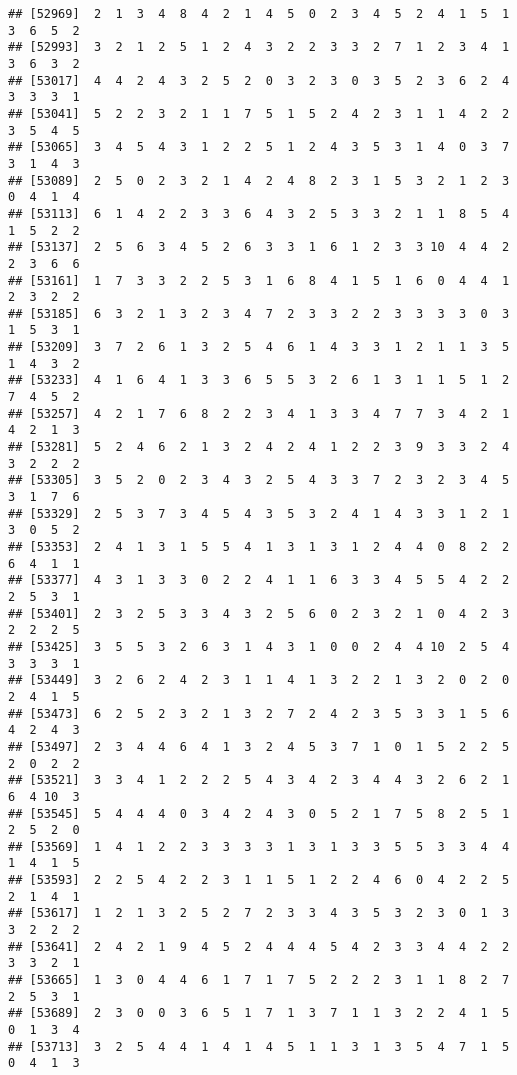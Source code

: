 \documentclass[
]{article}
\begin{document}
\begin{verbatim}
## [52969]  2  1  3  4  8  4  2  1  4  5  0  2  3  4  5  2  4  1  5  1  3  6  5  2
## [52993]  3  2  1  2  5  1  2  4  3  2  2  3  3  2  7  1  2  3  4  1  3  6  3  2
## [53017]  4  4  2  4  3  2  5  2  0  3  2  3  0  3  5  2  3  6  2  4  3  3  3  1
## [53041]  5  2  2  3  2  1  1  7  5  1  5  2  4  2  3  1  1  4  2  2  3  5  4  5
## [53065]  3  4  5  4  3  1  2  2  5  1  2  4  3  5  3  1  4  0  3  7  3  1  4  3
## [53089]  2  5  0  2  3  2  1  4  2  4  8  2  3  1  5  3  2  1  2  3  0  4  1  4
## [53113]  6  1  4  2  2  3  3  6  4  3  2  5  3  3  2  1  1  8  5  4  1  5  2  2
## [53137]  2  5  6  3  4  5  2  6  3  3  1  6  1  2  3  3 10  4  4  2  2  3  6  6
## [53161]  1  7  3  3  2  2  5  3  1  6  8  4  1  5  1  6  0  4  4  1  2  3  2  2
## [53185]  6  3  2  1  3  2  3  4  7  2  3  3  2  2  3  3  3  3  0  3  1  5  3  1
## [53209]  3  7  2  6  1  3  2  5  4  6  1  4  3  3  1  2  1  1  3  5  1  4  3  2
## [53233]  4  1  6  4  1  3  3  6  5  5  3  2  6  1  3  1  1  5  1  2  7  4  5  2
## [53257]  4  2  1  7  6  8  2  2  3  4  1  3  3  4  7  7  3  4  2  1  4  2  1  3
## [53281]  5  2  4  6  2  1  3  2  4  2  4  1  2  2  3  9  3  3  2  4  3  2  2  2
## [53305]  3  5  2  0  2  3  4  3  2  5  4  3  3  7  2  3  2  3  4  5  3  1  7  6
## [53329]  2  5  3  7  3  4  5  4  3  5  3  2  4  1  4  3  3  1  2  1  3  0  5  2
## [53353]  2  4  1  3  1  5  5  4  1  3  1  3  1  2  4  4  0  8  2  2  6  4  1  1
## [53377]  4  3  1  3  3  0  2  2  4  1  1  6  3  3  4  5  5  4  2  2  2  5  3  1
## [53401]  2  3  2  5  3  3  4  3  2  5  6  0  2  3  2  1  0  4  2  3  2  2  2  5
## [53425]  3  5  5  3  2  6  3  1  4  3  1  0  0  2  4  4 10  2  5  4  3  3  3  1
## [53449]  3  2  6  2  4  2  3  1  1  4  1  3  2  2  1  3  2  0  2  0  2  4  1  5
## [53473]  6  2  5  2  3  2  1  3  2  7  2  4  2  3  5  3  3  1  5  6  4  2  4  3
## [53497]  2  3  4  4  6  4  1  3  2  4  5  3  7  1  0  1  5  2  2  5  2  0  2  2
## [53521]  3  3  4  1  2  2  2  5  4  3  4  2  3  4  4  3  2  6  2  1  6  4 10  3
## [53545]  5  4  4  4  0  3  4  2  4  3  0  5  2  1  7  5  8  2  5  1  2  5  2  0
## [53569]  1  4  1  2  2  3  3  3  3  1  3  1  3  3  5  5  3  3  4  4  1  4  1  5
## [53593]  2  2  5  4  2  2  3  1  1  5  1  2  2  4  6  0  4  2  2  5  2  1  4  1
## [53617]  1  2  1  3  2  5  2  7  2  3  3  4  3  5  3  2  3  0  1  3  3  2  2  2
## [53641]  2  4  2  1  9  4  5  2  4  4  4  5  4  2  3  3  4  4  2  2  3  3  2  1
## [53665]  1  3  0  4  4  6  1  7  1  7  5  2  2  2  3  1  1  8  2  7  2  5  3  1
## [53689]  2  3  0  0  3  6  5  1  7  1  3  7  1  1  3  2  2  4  1  5  0  1  3  4
## [53713]  3  2  5  4  4  1  4  1  4  5  1  1  3  1  3  5  4  7  1  5  0  4  1  3

\end{verbatim}
\end{document}

